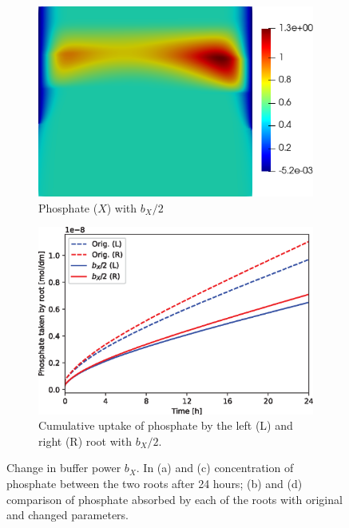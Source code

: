 \documentclass[11pt]{article}
\numberwithin{equation}{section}
\begin{document}
\begin{figure}[!htb]
\begin{subfigure}[t]{0.35\textwidth}
    \includegraphics[width=\textwidth]{Figures/X_bXdivby2.png}
    \caption{Phosphate ($X$) with $b_X / 2$}
    \label{fig:numexp_bxdown1}
\end{subfigure}
\hspace{1cm}
\begin{subfigure}[t]{0.4\textwidth}
    \includegraphics[width=\textwidth]{Figures/bxdivby2.eps}
    \caption{Cumulative uptake of phosphate by the left (L) and right (R) root with $b_X / 2$.}
    \label{fig:numexp_bxdown2}
\end{subfigure}
\caption{Change in buffer power $b_X$. In (a) and (c) concentration of phosphate between the two roots after 24 hours; (b) and (d) comparison of phosphate absorbed by each of the roots with original and changed parameters.}
\end{figure}
\end{document}
